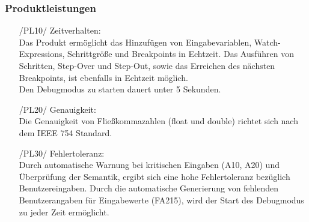 \documentclass[parskip=full]{scrartcl}
\begin{document}
		\subsubsection{Produktleistungen}
		\begin{itemize}
		\item[/PL10/] Zeitverhalten: \\
		Das Produkt ermöglicht das Hinzufügen von Eingabevariablen, Watch-Expressions, Schrittgröße und Breakpoints in Echtzeit. Das Ausführen von Schritten, Step-Over und Step-Out, sowie das Erreichen des nächsten Breakpoints, ist ebenfalls in Echtzeit möglich. \\
		Den Debugmodus zu starten dauert unter 5 Sekunden. 
		\item[/PL20/] Genauigkeit: \\
		Die Genauigkeit von Fließkommazahlen (float und double) richtet sich nach dem IEEE 754 Standard.

		\item[/PL30/] Fehlertoleranz: \\
		Durch automatische Warnung bei kritischen Eingaben (A10, A20) und Überprüfung der Semantik, ergibt sich eine hohe Fehlertoleranz bezüglich Benutzereingaben.
		Durch die automatische Generierung von fehlenden Benutzerangaben für Eingabewerte (FA215), wird der Start des Debugmodus zu jeder Zeit ermöglicht.
		\end{itemize}
		
\end{document}
